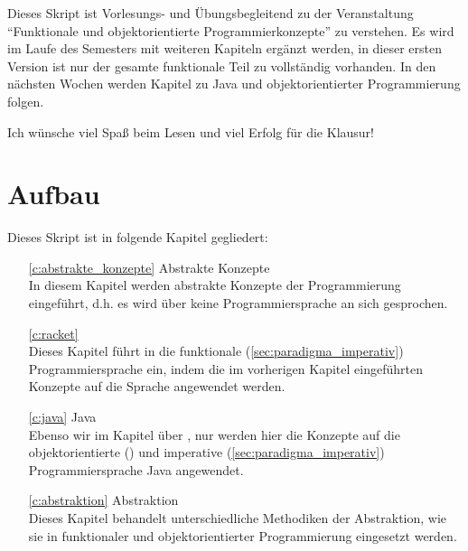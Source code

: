 Dieses Skript ist Vorlesungs- und Übungsbegleitend zu der Veranstaltung \enquote{Funktionale und objektorientierte Programmierkonzepte} zu verstehen. Es wird im Laufe des Semesters mit weiteren Kapiteln ergänzt werden, in dieser ersten Version ist nur der gesamte funktionale Teil zu \racketText vollständig vorhanden. In den nächsten Wochen werden Kapitel zu Java und objektorientierter Programmierung folgen.

Ich wünsche viel Spaß beim Lesen und viel Erfolg für die Klausur!

\section{Aufbau}
	Dieses Skript ist in folgende Kapitel gegliedert:
	\begin{itemize}
		\item[\ref{c:abstrakte_konzepte}] Abstrakte Konzepte \\ In diesem Kapitel werden abstrakte Konzepte der Programmierung eingeführt, d.h. es wird über keine Programmiersprache an sich gesprochen.
		\item[\ref{c:racket}] \racket \\ Dieses Kapitel führt in die funktionale (\ref{sec:paradigma_imperativ}) Programmiersprache \racket ein, indem die im vorherigen Kapitel eingeführten Konzepte auf die Sprache angewendet werden.
		\item[\ref{c:java}] Java \\ Ebenso wir im Kapitel über \racket, nur werden hier die Konzepte auf die objektorientierte () und imperative (\ref{sec:paradigma_imperativ}) Programmiersprache Java angewendet.
		\item[\ref{c:abstraktion}] Abstraktion \\ Dieses Kapitel behandelt unterschiedliche Methodiken der Abstraktion, wie sie in funktionaler und objektorientierter Programmierung eingesetzt werden.
	\end{itemize}

